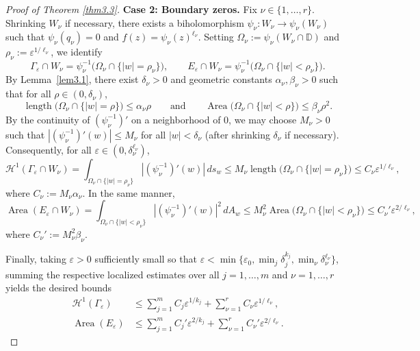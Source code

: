 \documentclass[12pt,twoside]{amsart}
\numberwithin{equation}{section}
\numberwithin{definition}{section} %
\begin{document}
\begin{proof}[Proof of Theorem \ref{thm3.3}]
\medskip
\noindent\textbf{Case 2: Boundary zeros.} 
Fix $\nu \in \{1, \dots, r\}$. Shrinking $W_\nu$ if necessary, there exists a biholomorphism $\psi_\nu \colon W_\nu \to \psi_\nu(W_\nu)$ such that $\psi_\nu(q_\nu) = 0$ and $f(z) = \psi_\nu(z)^{\ell_\nu}$. Setting $\Omega_\nu := \psi_\nu(W_\nu \cap \mathbb{D})$ and $\rho_\nu := \varepsilon^{1/\ell_\nu}$, we identify
\[
\Gamma_\varepsilon \cap W_\nu = \psi_\nu^{-1}\bigl(\Omega_\nu \cap \{|w| = \rho_\nu\}\bigr), \qquad E_\varepsilon \cap W_\nu = \psi_\nu^{-1}\bigl(\Omega_\nu \cap \{|w| < \rho_\nu\}\bigr).
\]
By Lemma~\ref{lem3.1}, there exist $\delta_\nu > 0$ and geometric constants $\alpha_\nu, \beta_\nu > 0$ such that for all $\rho \in (0, \delta_\nu)$,
\[
\operatorname{length}\bigl(\Omega_\nu \cap \{|w| = \rho\}\bigr) \le \alpha_\nu \rho \qquad \text{and} \qquad \operatorname{Area}\bigl(\Omega_\nu \cap \{|w| < \rho\}\bigr) \le \beta_\nu \rho^2.
\]
By the continuity of $(\psi_\nu^{-1})'$ on a neighborhood of $0$, we may choose $M_\nu > 0$ such that $|(\psi_\nu^{-1})'(w)| \le M_\nu$ for all $|w| < \delta_\nu$ (after shrinking $\delta_\nu$ if necessary). Consequently, for all $\varepsilon \in (0, \delta_\nu^{\ell_\nu})$,
\[
\mathcal{H}^1(\Gamma_\varepsilon \cap W_\nu) = \int_{\Omega_\nu \cap \{|w|=\rho_\nu\}} |(\psi_\nu^{-1})'(w)|\,ds_w \le M_\nu \operatorname{length}\bigl(\Omega_\nu \cap \{|w| = \rho_\nu\}\bigr) \le C_\nu \varepsilon^{1/\ell_\nu},
\]
where $C_\nu := M_\nu \alpha_\nu$. In the same manner,
\[
\operatorname{Area}(E_\varepsilon \cap W_\nu) = \int_{\Omega_\nu \cap \{|w|<\rho_\nu\}} |(\psi_\nu^{-1})'(w)|^2\,dA_w \le M_\nu^2 \operatorname{Area}\bigl(\Omega_\nu \cap \{|w| < \rho_\nu\}\bigr) \le C_\nu' \varepsilon^{2/\ell_\nu},
\]
where $C_\nu' := M_\nu^2 \beta_\nu$.

\medskip
Finally,
taking $\varepsilon > 0$ sufficiently small so that $\varepsilon < \min\bigl\{\varepsilon_0, \min_j \delta_j^{k_j}, \min_\nu \delta_\nu^{\ell_\nu}\bigr\}$, summing the respective localized estimates over all $j = 1, \dots, m$ and $\nu = 1, \dots, r$ yields the desired bounds 
 \begin{equation}\label{eq:global-geometric-bounds}
 \begin{aligned}
 \mathcal H^1(\Gamma_\varepsilon)
 &\leq
 \sum_{j=1}^m C_j\varepsilon^{1/k_j}
 +\sum_{\nu=1}^r C_\nu\varepsilon^{1/\ell_\nu},\\
 \operatorname{Area}(E_\varepsilon)
 &\leq
 \sum_{j=1}^m C_j'\varepsilon^{2/k_j}
 +\sum_{\nu=1}^r C_\nu'\varepsilon^{2/\ell_\nu}.
 \end{aligned}
 \end{equation}
\end{proof}
\end{document}
